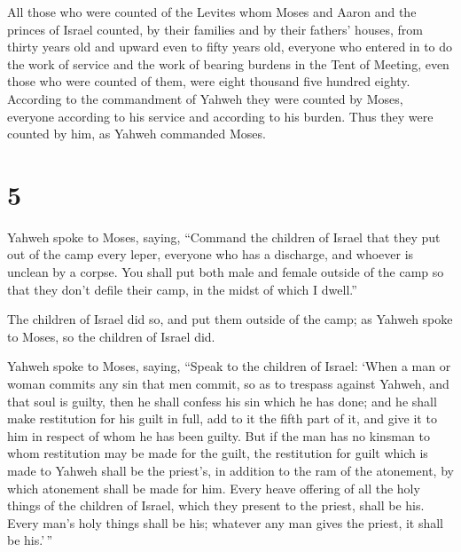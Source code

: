  All those who were counted of the Levites whom Moses and
Aaron and the princes of Israel counted, by their families and by their
fathers' houses,  from thirty years old and upward even to
fifty years old, everyone who entered in to do the work of service and
the work of bearing burdens in the Tent of Meeting,  even
those who were counted of them, were eight thousand five hundred eighty.
 According to the commandment of Yahweh they were counted
by Moses, everyone according to his service and according to his burden.
Thus they were counted by him, as Yahweh commanded Moses.

\hypertarget{section-4}{%
\section{5}\label{section-4}}

 Yahweh spoke to Moses, saying,  ``Command the
children of Israel that they put out of the camp every leper, everyone
who has a discharge, and whoever is unclean by a corpse. 
You shall put both male and female outside of the camp so that they
don't defile their camp, in the midst of which I dwell.''

 The children of Israel did so, and put them outside of the
camp; as Yahweh spoke to Moses, so the children of Israel did.

 Yahweh spoke to Moses, saying,  ``Speak to the
children of Israel: `When a man or woman commits any sin that men
commit, so as to trespass against Yahweh, and that soul is guilty,
 then he shall confess his sin which he has done; and he
shall make restitution for his guilt in full, add to it the fifth part
of it, and give it to him in respect of whom he has been guilty.
 But if the man has no kinsman to whom restitution may be
made for the guilt, the restitution for guilt which is made to Yahweh
shall be the priest's, in addition to the ram of the atonement, by which
atonement shall be made for him.  Every heave offering of
all the holy things of the children of Israel, which they present to the
priest, shall be his.  Every man's holy things shall be
his; whatever any man gives the priest, it shall be his.'\,''

